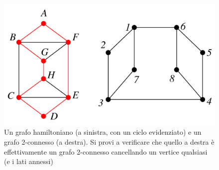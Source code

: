 \begin{figure}[H]
\centering
\includegraphics[scale = 0.4]{figures/2-conn-vs-hamilton.pdf}
\caption{Un grafo hamiltoniano (a sinistra, con un ciclo evidenziato) e un grafo 2-connesso (a destra).
Si provi a verificare che quello a destra è effettivamente un grafo 2-connesso
cancellando un vertice qualsiasi (e i lati annessi)}
\end{figure}